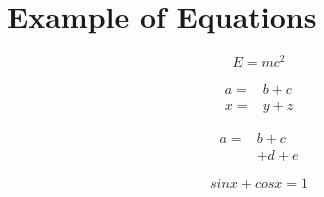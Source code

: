 \chapter{Example of Equations}

\begin{equation}
    E = mc^2
\end{equation}


\begin{align}
    a = {}& b + c\\
    x = {}& y + z
\end{align}


\begin{equation}
    \begin{split}
        a = {}& b + c\\
            {}& + d + e
    \end{split} 
\nonumber
\end{equation}
    
    
\begin{equation} 
sinx+cosx=1 
\end{equation}


